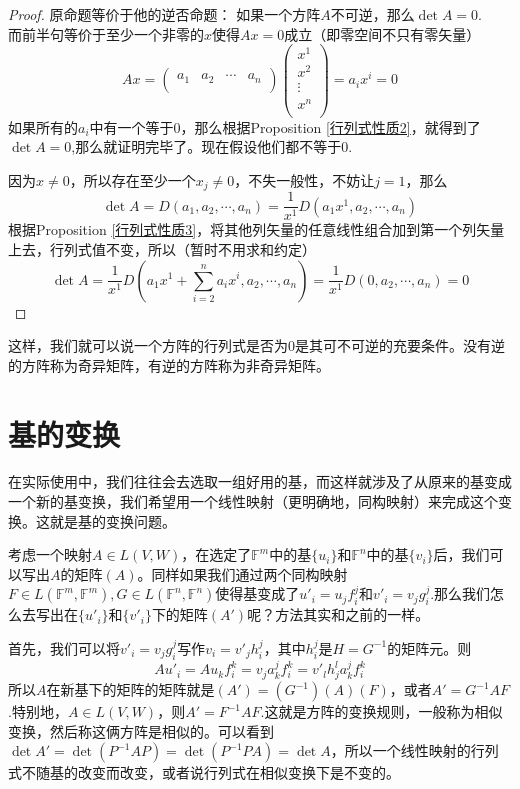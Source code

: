 \documentclass[11pt,a4paper,openany]{book}%
\theoremstyle{plain}%
\begin{document}
\begin{proof}原命题等价于他的逆否命题：
如果一个方阵$A$不可逆，那么$\det A=0$.\\
而前半句等价于至少一个非零的$x$使得$Ax=0$成立（即零空间不只有零矢量）
\[
Ax=\begin{pmatrix}
a_{1} & a_{2} & \cdots & a_{n}\\
\end{pmatrix}
\begin{pmatrix}
x^1\\
x^2\\
\vdots \\
x^n\\
\end{pmatrix}
=a_ix^i=0
\]
如果所有的$a_i$中有一个等于0，那么根据Proposition \ref{行列式性质2}，就得到了$\det A=0$,那么就证明完毕了。现在假设他们都不等于0.

因为$x\neq 0$，所以存在至少一个$x_j\neq0$，不失一般性，不妨让$j=1$，那么
\[
\det A=D(a_{1},a_{2},\cdots,a_{n})=\frac{1}{x^1}D(a_{1}x^1,a_{2},\cdots ,a_{n})
\]
根据Proposition \ref{行列式性质3}，将其他列矢量的任意线性组合加到第一个列矢量上去，行列式值不变，所以（暂时不用求和约定）
\[
\det A=\frac{1}{x^1}D\left(a_{1}x^1+\sum_{i=2}^n a_ix^i,a_{2},\cdots ,a_{n}\right)
=\frac{1}{x^1}D(0,a_{2},\cdots ,a_{n})=0
\]
\end{proof}

这样，我们就可以说一个方阵的行列式是否为0是其可不可逆的充要条件。没有逆的方阵称为{\kaishu 奇异矩阵}，有逆的方阵称为{\kaishu 非奇异矩阵}。
\section{基的变换}
在实际使用中，我们往往会去选取一组好用的基，而这样就涉及了从原来的基变成一个新的基变换，我们希望用一个线性映射（更明确地，同构映射）来完成这个变换。这就是基的变换问题。

考虑一个映射$A\in L(V,W)$，在选定了$\mathbb{F}^m$中的基$\{u_i\}$和$\mathbb{F}^n$中的基$\{v_i\}$后，我们可以写出$A$的矩阵$(A)$。同样如果我们通过两个同构映射$F \in L(\mathbb{F}^m,\mathbb{F}^m),G \in L(\mathbb{F}^n,\mathbb{F}^n)$使得基变成了$u'_i=u_jf_i^j$和$v'_i=v_jg_i^j$.那么我们怎么去写出在$\{u'_i\}$和$\{v'_i\}$下的矩阵$(A')$呢？方法其实和之前的一样。

首先，我们可以将$v'_i=v_jg_i^j$写作$v_i=v'_jh_i^j$，其中$h_i^j$是$H=G^{-1}$的矩阵元。则
\[
Au'_i=Au_kf_i^k=v_ja_k^jf_i^k=v'_lh_j^la_k^jf_i^k
\]
所以$A$在新基下的矩阵的矩阵就是$(A')=(G^{-1})(A)(F)$，或者$A'=G^{-1}AF$.特别地，$A\in L(V,W)$，则$A'=F^{-1}AF$.这就是方阵的变换规则，一般称为{\kaishu 相似变换}，然后称这俩方阵是{\kaishu 相似}的。可以看到$\det A'=\det (P^{-1}AP)=\det (P^{-1}PA)=\det A$，所以一个线性映射的行列式不随基的改变而改变，或者说行列式在相似变换下是不变的。
\end{document}
